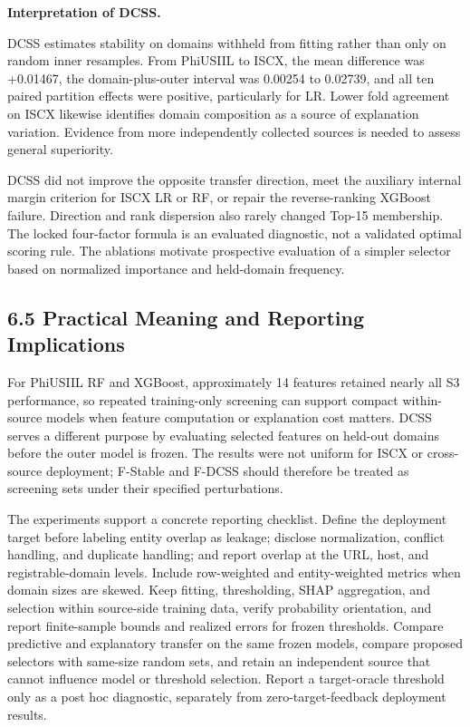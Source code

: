 \documentclass[
  10pt,
]{article}
\begin{document}
\textbf{Interpretation of DCSS.}

DCSS estimates stability on domains withheld from fitting rather than
only on random inner resamples. From PhiUSIIL to ISCX, the mean
difference was +0.01467, the domain-plus-outer interval was 0.00254 to
0.02739, and all ten paired partition effects were positive,
particularly for LR. Lower fold agreement on ISCX likewise identifies
domain composition as a source of explanation variation. Evidence from
more independently collected sources is needed to assess general
superiority.

DCSS did not improve the opposite transfer direction, meet the auxiliary
internal margin criterion for ISCX LR or RF, or repair the
reverse-ranking XGBoost failure. Direction and rank dispersion also
rarely changed Top-15 membership. The locked four-factor formula is an
evaluated diagnostic, not a validated optimal scoring rule. The
ablations motivate prospective evaluation of a simpler selector based on
normalized importance and held-domain frequency.

\subsection{6.5 Practical Meaning and Reporting
Implications}\label{practical-meaning-and-reporting-implications}

For PhiUSIIL RF and XGBoost, approximately 14 features retained nearly
all S3 performance, so repeated training-only screening can support
compact within-source models when feature computation or explanation
cost matters. DCSS serves a different purpose by evaluating selected
features on held-out domains before the outer model is frozen. The
results were not uniform for ISCX or cross-source deployment; F-Stable
and F-DCSS should therefore be treated as screening sets under their
specified perturbations.

The experiments support a concrete reporting checklist. Define the
deployment target before labeling entity overlap as leakage; disclose
normalization, conflict handling, and duplicate handling; and report
overlap at the URL, host, and registrable-domain levels. Include
row-weighted and entity-weighted metrics when domain sizes are skewed.
Keep fitting, thresholding, SHAP aggregation, and selection within
source-side training data, verify probability orientation, and report
finite-sample bounds and realized errors for frozen thresholds. Compare
predictive and explanatory transfer on the same frozen models, compare
proposed selectors with same-size random sets, and retain an independent
source that cannot influence model or threshold selection. Report a
target-oracle threshold only as a post hoc diagnostic, separately from
zero-target-feedback deployment results.
\end{document}
